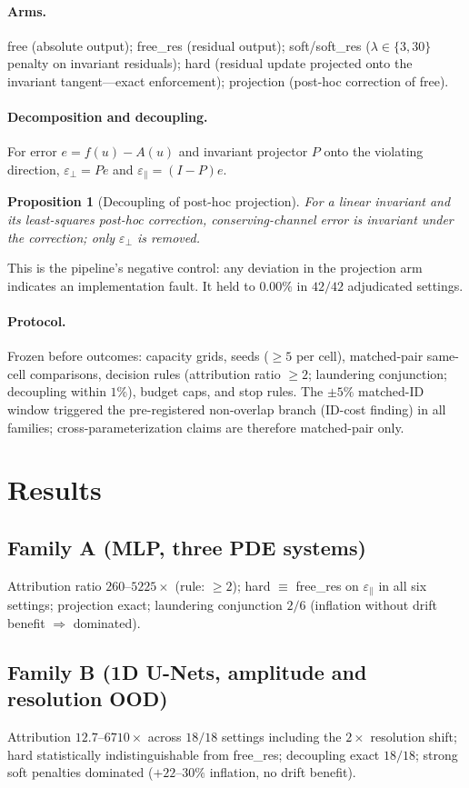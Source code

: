 \documentclass{article}
\newtheorem{proposition}{Proposition}
\newcommand{\cons}{\varepsilon_{\parallel}}
\newcommand{\drift}{\varepsilon_{\perp}}
\begin{document}
\paragraph{Arms.} free (absolute output); free\_res (residual output); soft/soft\_res
($\lambda\in\{3,30\}$ penalty on invariant residuals); hard (residual update projected onto
the invariant tangent---exact enforcement); projection (post-hoc correction of free).

\paragraph{Decomposition and decoupling.}
For error $e = f(u) - A(u)$ and invariant projector $P$ onto the violating direction,
$\drift = Pe$ and $\cons = (I-P)e$.
\begin{proposition}[Decoupling of post-hoc projection]
For a linear invariant and its least-squares post-hoc correction, conserving-channel error is
invariant under the correction; only $\drift$ is removed.
\end{proposition}
This is the pipeline's negative control: any deviation in the projection arm indicates an
implementation fault. It held to $0.00\%$ in $42/42$ adjudicated settings.

\paragraph{Protocol.} Frozen before outcomes: capacity grids, seeds ($\ge 5$ per cell),
matched-pair same-cell comparisons, decision rules (attribution ratio $\ge 2$;
laundering conjunction; decoupling within $1\%$), budget caps, and stop rules. The
$\pm5\%$ matched-ID window triggered the pre-registered non-overlap branch (ID-cost finding)
in all families; cross-parameterization claims are therefore matched-pair only.

\section{Results}
\subsection{Family A (MLP, three PDE systems)}
Attribution ratio $260$--$5225\times$ (rule: $\ge 2$); hard $\equiv$ free\_res on
$\cons$ in all six settings; projection exact; laundering conjunction $2/6$ (inflation
without drift benefit $\Rightarrow$ dominated).

\subsection{Family B (1D U-Nets, amplitude and resolution OOD)}
Attribution $12.7$--$6710\times$ across $18/18$ settings including the $2\times$ resolution
shift; hard statistically indistinguishable from free\_res; decoupling exact $18/18$; strong
soft penalties dominated ($+22$--$30\%$ inflation, no drift benefit).
\end{document}
